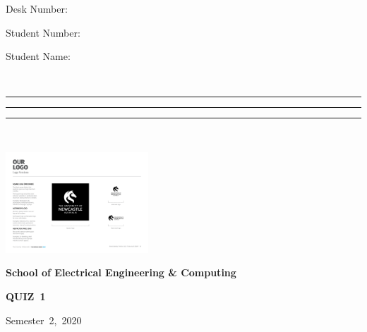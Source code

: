 \documentclass[a4paper,12pt]{article}
\newcommand{\semester}{2} %
\newcommand{\examyear}{2020} %
\newcommand{\quiznumber}{1} %
\begin{document}
\begin{doublespace}

  \vspace*{-10mm}


  \begin{minipage}[t]{0.23\linewidth}
  
  \footnotesize

  Desk Number:

  \vspace{0.5mm}

  Student Number:

  \vspace{0.5mm}

    Student Name: 

    {\ }
  \end{minipage}  \begin{minipage}[t]{0.4\linewidth}
  
  \footnotesize

  \rule{2cm}{0.2mm}

  \vspace{0.5mm}

  \rule{5cm}{0.2mm}

  \vspace{0.5mm}

     \rule{5cm}{0.2mm}

    {\ }
  \end{minipage}\hfill
\begin{minipage}[b]{3.78cm}
  \hspace*{10mm}\includegraphics[height=3.78cm]{uon_logo_black_square.pdf}
  \vspace*{-3.78cm}
  \end{minipage}


  \vspace{20mm}



\begin{center}
  \textbf{\large
    School of Electrical Engineering \& Computing}


    \textbf{\large QUIZ~\quiznumber}

    
    \textnormal{\footnotesize Semester~\semester,~\examyear}


\end{center}
\end{doublespace}
\end{document}
